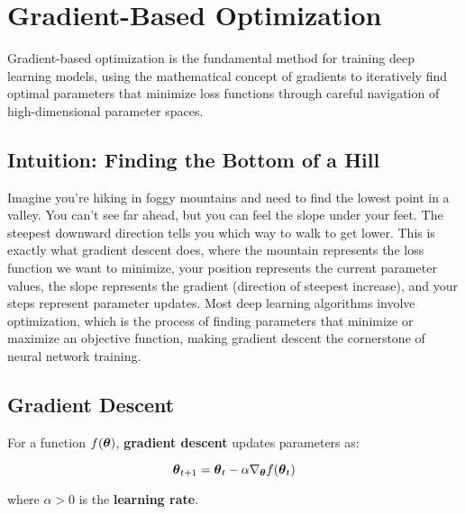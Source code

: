 
\section{Gradient-Based Optimization }
\label{sec:gradient-optimization}

Gradient-based optimization is the fundamental method for training deep learning models, using the mathematical concept of gradients to iteratively find optimal parameters that minimize loss functions through careful navigation of high-dimensional parameter spaces.

\subsection{Intuition: Finding the Bottom of a Hill}

Imagine you're hiking in foggy mountains and need to find the lowest point in a valley. You can't see far ahead, but you can feel the slope under your feet. The steepest downward direction tells you which way to walk to get lower. This is exactly what gradient descent does, where the mountain represents the loss function we want to minimize, your position represents the current parameter values, the slope represents the gradient (direction of steepest increase), and your steps represent parameter updates. Most deep learning algorithms involve optimization, which is the process of finding parameters that minimize or maximize an objective function, making gradient descent the cornerstone of neural network training.

\subsection{Gradient Descent}

For a function $f(\boldsymbol{\theta})$, \textbf{gradient descent} updates parameters as:

\begin{equation}
\boldsymbol{\theta}_{t+1} = \boldsymbol{\theta}_t - \alpha \nabla_{\boldsymbol{\theta}} f(\boldsymbol{\theta}_t)
\end{equation}

where $\alpha > 0$ is the \textbf{learning rate}.

